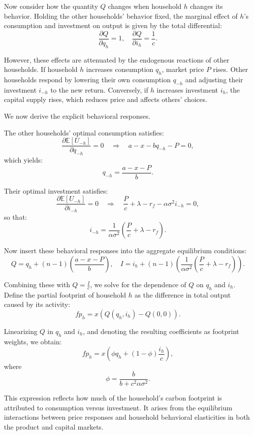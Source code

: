 \documentclass[12pt,a4paper]{article}%
\begin{document}
Now consider how the quantity \( Q \) changes when household \( h \) changes its behavior. Holding the other households' behavior fixed, the marginal effect of \( h \)'s consumption and investment on output is given by the total differential:
\[
\frac{\partial Q}{\partial q_h} = 1, \quad \frac{\partial Q}{\partial i_h} = \frac{1}{c}.
\]

However, these effects are attenuated by the endogenous reactions of other households. If household \( h \) increases consumption \( q_h \), market price \( P \) rises. Other households respond by lowering their own consumption \( q_{-h} \) and adjusting their investment \( i_{-h} \) to the new return. Conversely, if \( h \) increases investment \( i_h \), the capital supply rises, which reduces price and affects others' choices.

We now derive the explicit behavioral responses.

The other households' optimal consumption satisfies:
\[
\frac{\partial \mathbb{E}[U_{-h}]}{\partial q_{-h}} = 0 \quad \Rightarrow \quad a - x - b q_{-h} - P = 0,
\]
which yields:
\[
q_{-h} = \frac{a - x - P}{b}.
\]

Their optimal investment satisfies:
\[
\frac{\partial \mathbb{E}[U_{-h}]}{\partial i_{-h}} = 0 \quad \Rightarrow \quad \frac{P}{c} + \lambda - r_f - \alpha \sigma^2 i_{-h} = 0,
\]
so that:
\[
i_{-h} = \frac{1}{\alpha \sigma^2} \left( \frac{P}{c} + \lambda - r_f \right).
\]

Now insert these behavioral responses into the aggregate equilibrium conditions:
\[
Q = q_h + (n - 1) \left( \frac{a - x - P}{b} \right), \quad I = i_h + (n - 1) \left( \frac{1}{\alpha \sigma^2} \left( \frac{P}{c} + \lambda - r_f \right) \right).
\]

Combining these with \( Q = \frac{I}{c} \), we solve for the dependence of \( Q \) on \( q_h \) and \( i_h \). Define the partial footprint of household \( h \) as the difference in total output caused by its activity:
\[
fp_h = x \left( Q(q_h, i_h) - Q(0, 0) \right).
\]

Linearizing \( Q \) in \( q_h \) and \( i_h \), and denoting the resulting coefficients as footprint weights, we obtain:
\[
fp_h = x \left( \phi q_h + (1 - \phi) \frac{i_h}{c} \right),
\]
where
\[
\phi = \frac{b}{b + c^2 \alpha \sigma^2}.
\]

This expression reflects how much of the household’s carbon footprint is attributed to consumption versus investment. It arises from the equilibrium interactions between price responses and household behavioral elasticities in both the product and capital markets.
\end{document}
